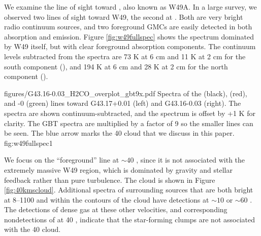 

We examine the line of sight toward \north, also known as W49A.  In a large
survey, we observed two lines of sight toward W49, the second at \south.  Both
are very bright radio continuum sources, and two foreground GMCs are easily
detected in both \formaldehyde absorption and \thirteenco emission.  Figure
\ref{fig:w49fullspec} shows the spectrum dominated by W49 itself, but with
clear \formaldehyde foreground absorption components.  The continuum levels
subtracted from the spectra are 73 K at 6 cm and 11 K at 2 cm for the south
component (\south), and 194 K at 6 cm and 28 K at 2 cm for the north component
(\north).


          {figures/G43.16-0.03_H2CO_overplot_gbt9x.pdf}
{Spectra of the \formaldehyde \oneone (black), \twotwo (red), and -0 (green) lines toward G43.17+0.01 (left) and G43.16-0.03 (right).
The \formaldehyde spectra are shown continuum-subtracted, and the \thirteenco
spectrum is offset by +1 K for clarity.  The GBT \twotwo spectra are multiplied
by a factor of 9 so the smaller lines can be seen.  The blue arrow marks the 40 \kms
cloud \GRSMC that we discuss in this paper. %
}{fig:w49fullspec}{1}

We focus on the ``foreground'' line at $\sim40$ \kms, since it is not
associated with the extremely massive W49 region, which is dominated by gravity
and stellar feedback rather than pure turbulence.  The cloud is shown in Figure
\ref{fig:40kmscloud}.  
Additional \formaldehyde spectra of surrounding sources that are both bright at
8--1100 \um and within the \thirteenco contours of the cloud have \formaldehyde
\twotwo detections at $\sim 10$ or $\sim 60$ \kms. The detections of dense gas
at these other velocities, and corresponding nondetections of \twotwo at 40
\kms, indicate that the star-forming clumps are not associated with the 40 \kms
cloud.  


